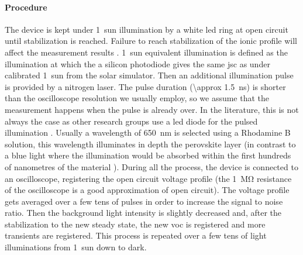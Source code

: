 	\paragraph{Procedure}
	The device is kept under 1~sun illumination by a white \gls{led} ring at open circuit until stabilization is reached.
	Failure to reach stabilization of the ionic profile will affect the measurement results \cite{ORegan2015b}.
	1~sun equivalent illumination is defined as the illumination at which the a silicon photodiode gives the same \gls{jsc} as under calibrated 1~sun from the solar simulator.
	Then an additional illumination pulse is provided by a nitrogen laser.
	The pulse duration (\SI{\approx 1.5}{\ns}) is shorter than the oscilloscope resolution we usually employ, so we assume that the measurement happens when the pulse is already over.
	In the literature, this is not always the case as other research groups use a \gls{led} diode for the pulsed illumination \cite{Calado2016}.
	Usually a wavelength of \SI{650}{\nm} is selected using a Rhodamine B solution\cite{RadiantDyesLaser}, this wavelength illuminates in depth the perovskite layer (in contrast to a blue light where the illumination would be absorbed within the first hundreds of nanometres of the material \cite{Bi2016,Tress2016}).
	During all the process, the device is connected to an oscilloscope, registering the open circuit voltage profile (the \SI{1}{\Mohm} resistance of the oscilloscope is a good approximation of open circuit).
	The voltage profile gets averaged over a few tens of pulses in order to increase the signal to noise ratio.
	Then the background light intensity is slightly decreased and, after the stabilization to the new steady state, the new  \gls{voc} is registered and more transients are registered.
	This process is repeated over a few tens of light illuminations from 1~sun down to dark.

